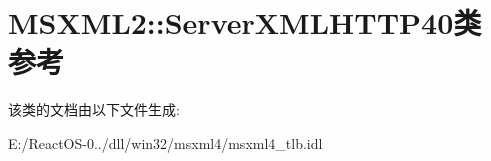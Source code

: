 \hypertarget{class_m_s_x_m_l2_1_1_server_x_m_l_h_t_t_p40}{}\section{M\+S\+X\+M\+L2\+:\+:Server\+X\+M\+L\+H\+T\+T\+P40类 参考}
\label{class_m_s_x_m_l2_1_1_server_x_m_l_h_t_t_p40}


该类的文档由以下文件生成\+:\begin{DoxyCompactItemize}
\item 
E\+:/\+React\+O\+S-\/0../dll/win32/msxml4/msxml4\+\_\+tlb.\+idl\end{DoxyCompactItemize}
